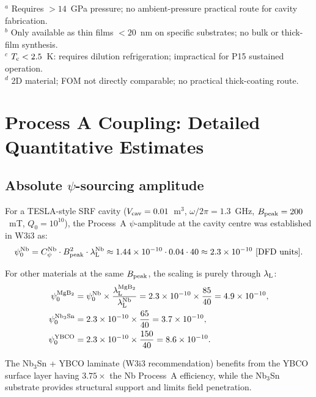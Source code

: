 \documentclass[11pt]{article}
\newcommand{\ee}[1]{\times 10^{#1}}
\newcommand{\lambdaL}{\lambda_{\rm L}}
\newcommand{\Tc}{T_{\rm c}}
\begin{document}
\begin{table}[H]
\noindent\small
$^a$ Requires $> 14$~GPa pressure; no ambient-pressure practical route for cavity fabrication.\\
$^b$ Only available as thin films $< 20$~nm on specific substrates; no bulk or thick-film synthesis.\\
$^c$ $\Tc < 2.5$~K: requires dilution refrigeration; impractical for P15 sustained operation.\\
$^d$ 2D material; FOM not directly comparable; no practical thick-coating route.
\end{table}

\section{Process A Coupling: Detailed Quantitative Estimates}
\label{sec:quant}

\subsection{Absolute $\psi$-sourcing amplitude}

For a TESLA-style SRF cavity ($V_{\rm cav} = 0.01$~m$^3$, $\omega/2\pi = 1.3$~GHz,
$B_{\rm peak} = 200$~mT, $Q_0 = 10^{10}$), the Process~A $\psi$-amplitude
at the cavity centre was established in W3i3 as:
\begin{equation}
\psi_0^{\rm Nb} = C_\psi^{\rm Nb} \cdot B_{\rm peak}^2 \cdot \lambdaL^{\rm Nb}
\approx 1.44\ee{-10} \cdot 0.04 \cdot 40 \approx 2.3\ee{-10}~[\text{DFD units}].
\end{equation}

For other materials at the same $B_{\rm peak}$, the scaling is purely through
$\lambdaL$:
\begin{align}
\psi_0^{\rm MgB_2} &= \psi_0^{\rm Nb} \times \frac{\lambdaL^{\rm MgB_2}}{\lambdaL^{\rm Nb}}
  = 2.3\ee{-10} \times \frac{85}{40} = 4.9\ee{-10}, \\
\psi_0^{\rm Nb_3Sn} &= 2.3\ee{-10} \times \frac{65}{40} = 3.7\ee{-10}, \\
\psi_0^{\rm YBCO} &= 2.3\ee{-10} \times \frac{150}{40} = 8.6\ee{-10}.
\end{align}

The Nb$_3$Sn + YBCO laminate (W3i3 recommendation) benefits from the YBCO
surface layer having $3.75\times$ the Nb Process~A efficiency, while the
Nb$_3$Sn substrate provides structural support and limits field penetration.
\end{document}
